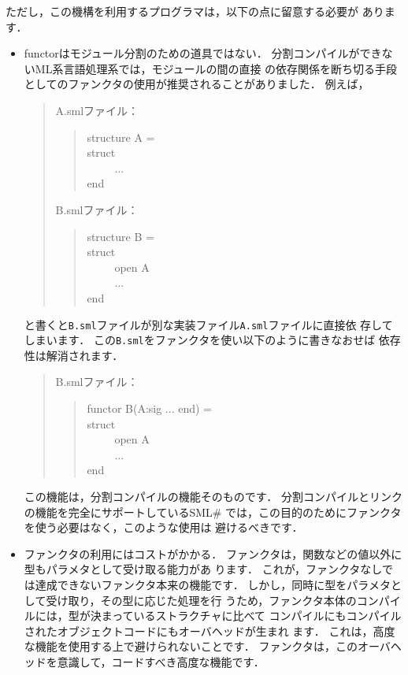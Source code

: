 \documentclass{jbook}
\newcommand{\smlsharp}{SML\#}
\newenvironment{program}{\begin{tt}\begin{quote}}{\end{quote}\end{tt}}
\newcommand{\myem}{\ \ \ \ \  }
\begin{document}
	ただし，この機構を利用するプログラマは，以下の点に留意する必要が
あります．
\begin{itemize}
\item functorはモジュール分割のための道具ではない．
	分割コンパイルができないML系言語処理系では，モジュールの間の直接
の依存関係を断ち切る手段としてのファンクタの使用が推奨されることがありました．
	例えば，
\begin{quote}
\begin{minipage}{0.9\textwidth}
A.smlファイル：
\begin{program}
structure A =\\
struct\\
\myem   ...\\
end
\end{program}
B.smlファイル：
\begin{program}
structure B = \\
struct\\
\myem  open A\\
\myem  ...\\
end
\end{program}
\end{minipage}
\end{quote}
と書くと{\tt B.sml}ファイルが別な実装ファイル{\tt A.sml}ファイルに直接依
存してしまいます．
	この{\tt B.sml}をファンクタを使い以下のように書きなおせば
依存性は解消されます．
\begin{quote}
\begin{minipage}{0.9\textwidth}
B.smlファイル：
\begin{program}
functor B(A:sig ... end) = \\
struct\\
\myem  open A\\
\myem  ...\\
end
\end{program}
\end{minipage}
\end{quote}	
	この機能は，分割コンパイルの機能そのものです．
	分割コンパイルとリンクの機能を完全にサポートしている\smlsharp{}
では，この目的のためにファンクタを使う必要はなく，このような使用は
避けるべきです．

\item ファンクタの利用にはコストがかかる．
	ファンクタは，関数などの値以外に型もパラメタとして受け取る能力があ
ります．
	これが，ファンクタなしでは達成できないファンクタ本来の機能です．
	しかし，同時に型をパラメタとして受け取り，その型に応じた処理を行
うため，ファンクタ本体のコンパイルには，型が決まっているストラクチャに比べて
コンパイルにもコンパイルされたオブジェクトコードにもオーバヘッドが生まれ
ます．
	これは，高度な機能を使用する上で避けられないことです．
	ファンクタは，このオーバヘッドを意識して，コードすべき高度な機能です．
\end{itemize}
\end{document}
